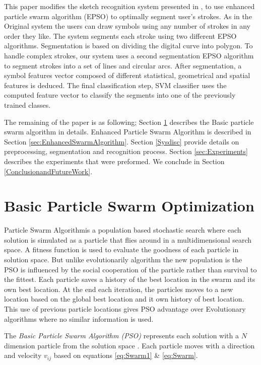 \documentclass[12pt,1p,times]{elsarticle}%
\begin{document}
This paper modifies the sketch recognition system presented in \cite{mypaper}, to use enhanced particle swarm algorithm (EPSO) to optimally segment user's strokes. As in the Original system the users can draw symbols using any number of strokes in any order they like. The system segments each stroke using two different EPSO algorithms. Segmentation is based on dividing the digital curve into polygon\cite{PolygonApproximationPSO}. To handle complex strokes, our system uses a second segmentation EPSO algorithm to segment strokes into a set of lines and circular arcs. After segmentation, a symbol features vector composed of different statistical, geometrical and spatial features is deduced. The final classification step, SVM classifier uses the computed feature vector to classify the segments into one of the previously trained classes. 

The remaining of the paper is as following; Section \ref{sec:ParticleSwarmAlgorithm} describes the Basic particle swarm algorithm in details.  Enhanced Particle Swarm Algorithm is described in Section \ref{sec:EnhancedSwarmAlgorithm}. Section \ref{Sysdisc} provide details on preprocessing, segmentation and recognition process. Section \ref{sec:Experiments} describes the experiments that were preformed. We conclude in Section \ref{ConclusionandFutureWork}.
 

\section{Basic Particle Swarm Optimization}
\label{sec:ParticleSwarmAlgorithm}

 Particle Swarm Algorithm\cite{PSOFirst}is a population based stochastic search where each solution is simulated as a  particle that flies around in a multidimensional search space. A fitness function is used to evaluate the goodness of each particle in solution space. But unlike evolutionarily algorithm the new population is the PSO is influenced by the social cooperation of the particle rather than survival to the fittest. Each particle saves a history of the best location in the swarm and its own best location.  At the end each iteration, the particles moves to a new location based on the global best location and it own history of best location. This use of previous particle locations gives PSO advantage over Evolutionary algorithms where no similar information is used.

 The \textit{Basic Particle Swarm Algorithm (PSO)} represents each solution with a $N$ dimension particle from the solution space \cite{PSOFirst}. Each particle moves with a direction and velocity $v_{ij}$ based on equations \ref{eq:Swarm1} \& \ref{eq:Swarm}.
\end{document}
